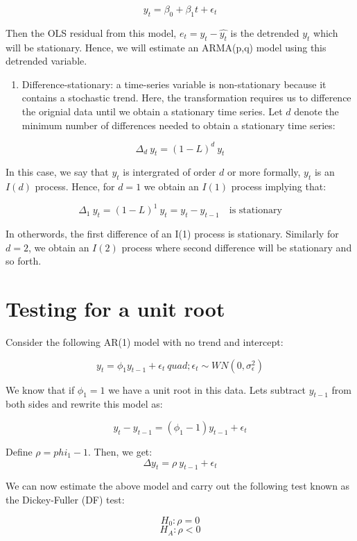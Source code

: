 \documentclass[]{book}
\providecommand{\tightlist}{%
  \setlength{\itemsep}{0pt}\setlength{\parskip}{0pt}}
\theoremstyle{definition}
\theoremstyle{definition}
\theoremstyle{definition}
\theoremstyle{remark}
\begin{document}
\[y_t = \beta_0 +\beta_1 t +\epsilon_t\]

Then the OLS residual from this model, \(e_t=y_t-\hat{y_t}\) is the
detrended \(y_t\) which will be stationary. Hence, we will estimate an
ARMA(p,q) model using this detrended variable.

\begin{enumerate}
\def\labelenumi{\arabic{enumi}.}
\setcounter{enumi}{1}
\tightlist
\item
  Difference-stationary: a time-series variable is non-stationary
  because it contains a stochastic trend. Here, the transformation
  requires us to difference the orignial data until we obtain a
  stationary time series. Let \(d\) denote the minimum number of
  differences needed to obtain a stationary time series:
\end{enumerate}

\[\Delta_d \ y_t=(1-L)^d \ y_t\]

In this case, we say that \(y_t\) is intergrated of order \(d\) or more
formally, \(y_t\) is an \(I(d)\) process. Hence, for \(d=1\) we obtain
an \(I(1)\) process implying that:

\[\Delta_1 \ y_t=(1-L)^1 \ y_t=y_t-y_{t-1} \quad  \text{is stationary}\]

In otherwords, the first difference of an I(1) process is stationary.
Similarly for \(d=2\), we obtain an \(I(2)\) process where second
difference will be stationary and so forth.

\hypertarget{testing-for-a-unit-root}{%
\section{Testing for a unit root}\label{testing-for-a-unit-root}}

Consider the following AR(1) model with no trend and intercept:

\[y_t=\phi_1 y_{t-1} +\epsilon_t  \ quad ; \epsilon_t\sim WN(0,\sigma^2_\epsilon)\]

We know that if \(\phi_1=1\) we have a unit root in this data. Lets
subtract \(y_{t-1}\) from both sides and rewrite this model as:

\[y_t-y_{t-1}= (\phi_1-1)y_{t-1}+\epsilon_t \]

Define \(\rho=phi_1-1\). Then, we get:
\[\Delta y_t= \rho \ y_{t-1}+\epsilon_t \]

We can now estimate the above model and carry out the following test
known as the Dickey-Fuller (DF) test:

\[H_0: \rho=0 \] \[H_A: \rho<0\]
\end{document}
